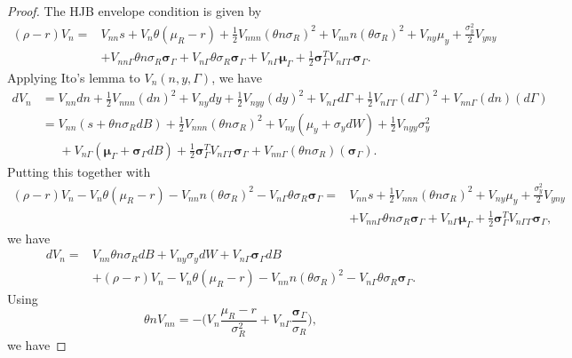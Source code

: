 \documentclass[11pt]{extarticle}
\theoremstyle{plain}
\theoremstyle{definition}
\begin{document}
\begin{enumerate}[(a)]
\begin{proof}
	The HJB envelope condition is given by
	\begin{align*}
		(\rho - r) V_n = & V_{nn} s + V_n  \theta (\mu_R - r) + \frac{1}{2} V_{nnn} (\theta n \sigma_R )^2 +  V_{nn} n (\theta \sigma_R )^2  + V_{ny} \mu_y + \frac{\sigma_y^2}{2} V_{yny} \\
		& + V_{nn \Gamma} \theta n \sigma_R  \bm \sigma_\Gamma + V_{n \Gamma} \theta \sigma_R  \bm \sigma_\Gamma  + V_{n\Gamma} \bm \mu_\Gamma  + \frac{1}{2} \bm \sigma_\Gamma^T V_{ n \Gamma \Gamma} \bm \sigma_\Gamma.
	\end{align*}
	Applying Ito's lemma to $V_n(n, y, \Gamma)$, we have 
	\begin{align*}
		dV_n &= V_{nn} dn + \frac{1}{2} V_{nnn} (dn)^2 + V_{ny} dy + \frac{1}{2} V_{nyy} (dy)^2 + V_{n \Gamma} d\Gamma + \frac{1}{2} V_{n\Gamma \Gamma} (d\Gamma)^2  + V_{nn \Gamma} (dn) ( d \Gamma) \\
		&= V_{nn} (s + \theta n \sigma_R dB) + \frac{1}{2} V_{nnn} (\theta n \sigma_R)^2 + V_{ny} (\mu_y + \sigma_y dW) + \frac{1}{2} V_{nyy} \sigma_y^2 \\
		& \;\;\;\;\; + V_{n \Gamma} (\bm \mu_\Gamma + \bm \sigma_\Gamma dB ) + \frac{1}{2} \bm{\sigma}_\Gamma^T V_{n\Gamma \Gamma} \bm \sigma_\Gamma  + V_{nn \Gamma} (\theta n \sigma_R) ( \bm{\sigma}_\Gamma).
	\end{align*}
	Putting this together with 
	\begin{align*}
		(\rho - r) V_n - V_n  \theta (\mu_R - r) -  V_{nn} n (\theta \sigma_R )^2 - V_{n \Gamma} \theta \sigma_R  \bm \sigma_\Gamma  = & V_{nn} s + \frac{1}{2} V_{nnn} (\theta n \sigma_R )^2  + V_{ny} \mu_y + \frac{\sigma_y^2}{2} V_{yny} \\
		& + V_{nn \Gamma} \theta n \sigma_R  \bm \sigma_\Gamma + V_{n\Gamma} \bm \mu_\Gamma  + \frac{1}{2} \bm \sigma_\Gamma^T V_{ n \Gamma \Gamma} \bm \sigma_\Gamma,
	\end{align*}
	we have 
	\begin{align*}
		dV_n = &V_{nn} \theta n \sigma_R dB + V_{ny} \sigma_y dW + V_{n \Gamma}  \bm \sigma_\Gamma dB  \\
		&  + (\rho - r) V_n - V_n  \theta (\mu_R - r) -  V_{nn} n (\theta \sigma_R )^2 - V_{n \Gamma} \theta \sigma_R  \bm \sigma_\Gamma. 
	\end{align*}
	Using 
	\begin{equation*}
		\theta n V_{nn} = - \bigg( V_n \frac{\mu_R - r}{\sigma_R^2 } + V_{n \Gamma} \frac{ \bm \sigma_\Gamma }{\sigma_R} \bigg),
	\end{equation*}
	we have 

\end{proof}
\end{enumerate}
\end{document}
